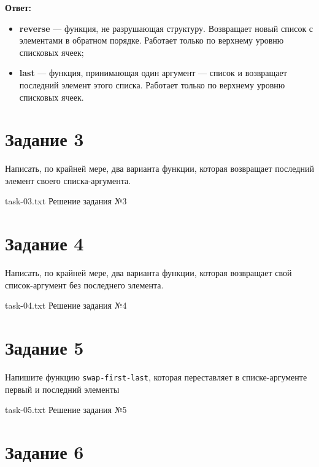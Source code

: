 \textbf{Ответ:}

\begin{itemize}[label*=--]
	\item \textbf{reverse} --- функция, не разрушающая структуру. Возвращает новый список с элементами в обратном порядке. Работает только по верхнему уровню списковых ячеек;
	\item \textbf{last} --- функция, принимающая один аргумент --- список и возвращает последний элемент этого списка. Работает только по верхнему уровню списковых ячеек.
\end{itemize}

\clearpage

\section{Задание 3}

Написать, по крайней мере, два варианта функции, которая возвращает последний элемент своего списка-аргумента.

{task-03.txt} %
{Решение задания №3} %

\section{Задание 4}

Написать, по крайней мере, два варианта функции, которая возвращает свой список-аргумент без последнего элемента.

{task-04.txt} %
{Решение задания №4} %

\section{Задание 5}

Напишите функцию \texttt{swap-first-last}, которая переставляет в списке-аргументе первый и последний элементы

{task-05.txt} %
{Решение задания №5} %

\section{Задание 6}

